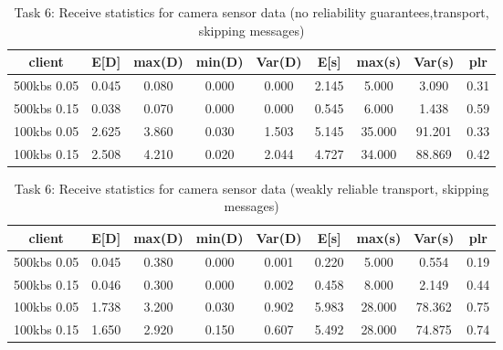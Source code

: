 \begin{table}
\centering
\begin{tabular}{|c|c|c|c|c|c|c|c|c|}
\hline
client & E[D] & max(D) & min(D) & Var(D) & E[s] & max(s) & Var(s) & plr\\
\hline
500kbs 0.05 & 0.045 & 0.080 & 0.000 & 0.000 & 2.145 & 5.000 & 3.090 & 0.31\\
\hline 
500kbs 0.15 & 0.038 & 0.070 & 0.000 & 0.000 & 0.545 & 6.000 & 1.438 & 0.59\\
\hline
100kbs 0.05 & 2.625 & 3.860 & 0.030 & 1.503 & 5.145 & 35.000 & 91.201 & 0.33\\
\hline
100kbs 0.15 & 2.508 & 4.210 & 0.020 & 2.044 & 4.727 & 34.000 & 88.869 & 0.42\\
\hline
\end{tabular}
\caption{Task 6: Receive statistics for camera sensor data (no reliability guarantees,transport, skipping messages)}
\label{table:task6-camera-c}
\end{table}



\begin{table}
\centering
\begin{tabular}{|c|c|c|c|c|c|c|c|c|}
\hline
client & E[D] & max(D) & min(D) & Var(D) & E[s] & max(s) & Var(s) & plr\\
\hline
500kbs 0.05 & 0.045 & 0.380 & 0.000 & 0.001 & 0.220 & 5.000 & 0.554 & 0.19\\
\hline 
500kbs 0.15 & 0.046 & 0.300 & 0.000 & 0.002 & 0.458 & 8.000 &  2.149 & 0.44\\
\hline
100kbs 0.05 & 1.738 & 3.200 & 0.030 & 0.902 & 5.983 & 28.000 & 78.362 & 0.75\\
\hline
100kbs 0.15 & 1.650 & 2.920 & 0.150 & 0.607 & 5.492 & 28.000 & 74.875 & 0.74\\
\hline
\end{tabular}
\caption{Task 6: Receive statistics for camera sensor data (weakly reliable transport, skipping messages)}
\label{table:task6-camera-d}
\end{table}

